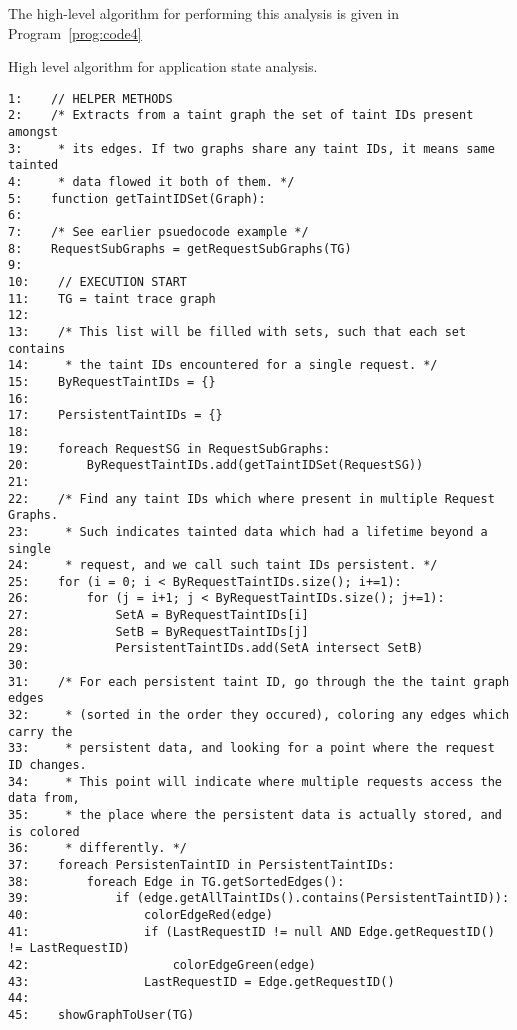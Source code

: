 \documentclass[msc,oneside]{ubcthesis}
\begin{document}
The high-level algorithm for performing this analysis is given in Program~\ref{prog:code4}

\begin{Program}
  \caption{\label{prog:code4} High level algorithm for application state analysis.}
\begin{verbatim}
1:    // HELPER METHODS
2:    /* Extracts from a taint graph the set of taint IDs present amongst
3:     * its edges. If two graphs share any taint IDs, it means same tainted
4:     * data flowed it both of them. */
5:    function getTaintIDSet(Graph):
6:    
7:    /* See earlier psuedocode example */
8:    RequestSubGraphs = getRequestSubGraphs(TG)
9:    
10:    // EXECUTION START
11:    TG = taint trace graph
12:    
13:    /* This list will be filled with sets, such that each set contains
14:     * the taint IDs encountered for a single request. */
15:    ByRequestTaintIDs = {}
16:    
17:    PersistentTaintIDs = {}
18:    
19:    foreach RequestSG in RequestSubGraphs:
20:        ByRequestTaintIDs.add(getTaintIDSet(RequestSG))
21:        
22:    /* Find any taint IDs which where present in multiple Request Graphs.
23:     * Such indicates tainted data which had a lifetime beyond a single
24:     * request, and we call such taint IDs persistent. */
25:    for (i = 0; i < ByRequestTaintIDs.size(); i+=1):
26:        for (j = i+1; j < ByRequestTaintIDs.size(); j+=1):
27:            SetA = ByRequestTaintIDs[i]
28:            SetB = ByRequestTaintIDs[j]
29:            PersistentTaintIDs.add(SetA intersect SetB)
30:    
31:    /* For each persistent taint ID, go through the the taint graph edges
32:     * (sorted in the order they occured), coloring any edges which carry the
33:     * persistent data, and looking for a point where the request ID changes.
34:     * This point will indicate where multiple requests access the data from,
35:     * the place where the persistent data is actually stored, and is colored
36:     * differently. */
37:    foreach PersistenTaintID in PersistentTaintIDs:
38:        foreach Edge in TG.getSortedEdges():
39:            if (edge.getAllTaintIDs().contains(PersistentTaintID)):
40:                colorEdgeRed(edge)
41:                if (LastRequestID != null AND Edge.getRequestID() != LastRequestID)
42:                    colorEdgeGreen(edge)
43:                LastRequestID = Edge.getRequestID()
44:                
45:    showGraphToUser(TG)
\end{verbatim}
\end{Program}
\end{document}
